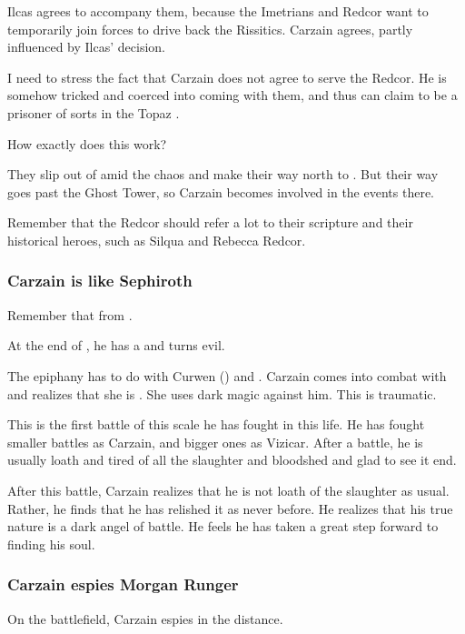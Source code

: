 Ilcas agrees to accompany them, because the Imetrians and Redcor want to temporarily join forces to drive back the Rissitics. Carzain agrees, partly influenced by Ilcas' decision. 

I need to stress the fact that Carzain does not agree to serve the Redcor. He is somehow tricked and coerced into coming with them, and thus can claim to be a prisoner of sorts in the Topaz \Chateau. 

How exactly does this work?

They slip out of \Forclin{} amid the chaos and make their way north to \Redce{}. 
But their way goes past the Ghost Tower, so Carzain becomes involved in the events there. 

Remember that the Redcor should refer a lot to their scripture and their historical heroes, such as Silqua and Rebecca Redcor. 





\subsubsection{Carzain is like Sephiroth}
Remember that  from \cite{VideoGame:FinalFantasyVII}. 

At the end of \TwilightAngelRememberEmph, he has a  and turns evil. 

The epiphany has to do with Curwen () and \Takestsha.
Carzain comes into combat with \Takestsha and realizes that she is \Nzessuacrith. 
She uses dark magic against him. 
This is traumatic. 

This is the first battle of this scale he has fought in this life.
He has fought smaller battles as Carzain, and bigger ones as Vizicar.
After a battle, he is usually loath and tired of all the slaughter and bloodshed and glad to see it end. 

After this battle, Carzain realizes that he is not loath of the slaughter as usual.
Rather, he finds that he has relished it as never before. 
He realizes that his true nature is a dark angel of battle.
He feels he has taken a great step forward to finding his soul. 





\subsubsection{Carzain espies Morgan Runger}
On the battlefield, Carzain espies  in the distance. 

